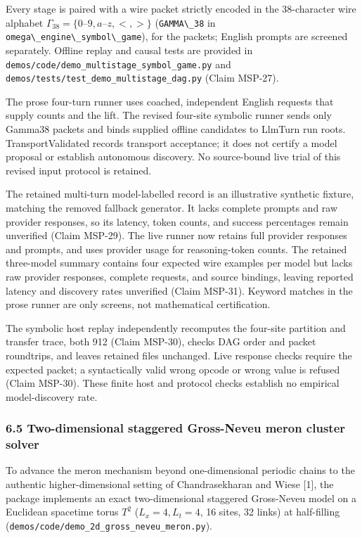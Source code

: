 \documentclass[
  11pt,
]{article}
\newcommand{\passthrough}[1]{#1}
\begin{document}
Every stage is paired with a wire packet strictly encoded in the
38-character wire alphabet
\(\Gamma_{38} = \{0\text{--}9, a\text{--}z, <, >\}\)
(\passthrough{\lstinline!GAMMA\_38!} in
\passthrough{\lstinline!omega\_engine\_symbol\_game!}), for the packets;
English prompts are screened separately. Offline replay and causal tests
are provided in \nolinkurl{demos/code/demo_multistage_symbol_game.py}
and \nolinkurl{demos/tests/test_demo_multistage_dag.py} (Claim MSP-27).

The prose four-turn runner uses coached, independent English requests
that supply counts and the lift. The revised four-site symbolic runner
sends only Gamma38 packets and binds supplied offline candidates to
LlmTurn run roots. TransportValidated records transport acceptance; it
does not certify a model proposal or establish autonomous discovery. No
source-bound live trial of this revised input protocol is retained.

The retained multi-turn model-labelled record is an illustrative
synthetic fixture, matching the removed fallback generator. It lacks
complete prompts and raw provider responses, so its latency, token
counts, and success percentages remain unverified (Claim MSP-29). The
live runner now retains full provider responses and prompts, and uses
provider usage for reasoning-token counts. The retained three-model
summary contains four expected wire examples per model but lacks raw
provider responses, complete requests, and source bindings, leaving
reported latency and discovery rates unverified (Claim MSP-31). Keyword
matches in the prose runner are only screens, not mathematical
certification.

The symbolic host replay independently recomputes the four-site
partition and transfer trace, both 912 (Claim MSP-30), checks DAG order
and packet roundtrips, and leaves retained files unchanged. Live
response checks require the expected packet; a syntactically valid wrong
opcode or wrong value is refused (Claim MSP-30). These finite host and
protocol checks establish no empirical model-discovery rate.

\subsubsection{6.5 Two-dimensional staggered Gross-Neveu meron cluster
solver}\label{two-dimensional-staggered-gross-neveu-meron-cluster-solver}

To advance the meron mechanism beyond one-dimensional periodic chains to
the authentic higher-dimensional setting of Chandrasekharan and Wiese
{[}1{]}, the package implements an exact two-dimensional staggered
Gross-Neveu model on a Euclidean spacetime torus \(T^2\)
(\(L_x = 4, L_t = 4\), 16 sites, 32 links) at half-filling
(\nolinkurl{demos/code/demo_2d_gross_neveu_meron.py}).
\end{document}
